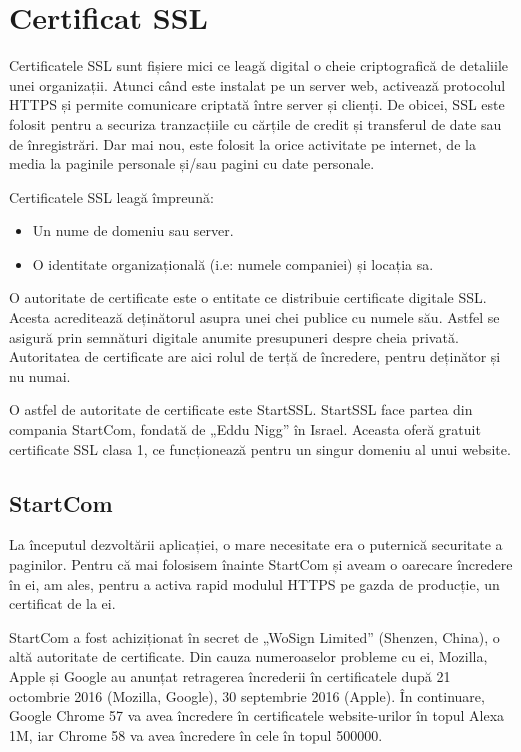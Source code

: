 \section{Certificat SSL}
	Certificatele SSL sunt fișiere mici ce leagă digital o cheie criptografică de detaliile unei organizații.
	Atunci când este instalat pe un server web, activează protocolul HTTPS și permite comunicare criptată între server și clienți.
	De obicei, SSL este folosit pentru a securiza tranzacțiile cu cărțile de credit și transferul de date sau de înregistrări.
	Dar mai nou, este folosit la orice activitate pe internet, de la media la paginile personale și/sau pagini cu date personale.

	Certificatele SSL leagă împreună:

	\begin{itemize}
		\item Un nume de domeniu sau server.
		\item O identitate organizațională (i.e: numele companiei) și locația sa.
	\end{itemize}

	O autoritate de certificate este o entitate ce distribuie certificate digitale SSL.
	Acesta acreditează deținătorul asupra unei chei publice cu numele său.
	Astfel se asigură prin semnături digitale anumite presupuneri despre cheia privată.
	Autoritatea de certificate are aici rolul de terță de încredere, pentru deținător și nu numai.

	O astfel de autoritate de certificate este StartSSL.
	StartSSL face partea din compania StartCom, fondată de „Eddu Nigg” în Israel.
	Aceasta oferă gratuit certificate SSL clasa 1, ce funcționează pentru un singur domeniu al unui website.

	\subsection{StartCom}

		La începutul dezvoltării aplicației, o mare necesitate era o puternică securitate a paginilor.
		Pentru că mai folosisem înainte StartCom și aveam o oarecare încredere în ei, am ales, pentru a activa rapid modulul HTTPS pe gazda de producție, un certificat de la ei.

		StartCom a fost achiziționat în secret de „WoSign Limited” (Shenzen, China), o altă autoritate de certificate.
		Din cauza numeroaselor probleme cu ei, Mozilla, Apple și Google au anunțat retragerea încrederii în certificatele după 21 octombrie 2016 (Mozilla, Google), 30 septembrie 2016 (Apple).
		În continuare, Google Chrome 57 va avea încredere în certificatele website-urilor în topul Alexa 1M, iar Chrome 58 va avea încredere în cele în topul 500000. \cite{chrome_wosign}

